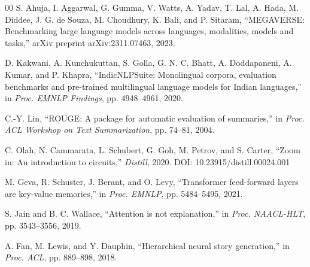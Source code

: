 \documentclass[conference]{IEEEtran}
\begin{document}
\begin{thebibliography}{00}
S. Ahuja, I. Aggarwal, G. Gumma, V. Watts, A. Yadav, 
T. Lal, A. Hada, M. Diddee, J. G. de Souza, M. Choudhury, 
K. Bali, and P. Sitaram, ``MEGAVERSE: Benchmarking large 
language models across languages, modalities, models and 
tasks,'' arXiv preprint arXiv:2311.07463, 2023.

D. Kakwani, A. Kunchukuttan, S. Golla, G. N. C. Bhatt, 
A. Doddapaneni, A. Kumar, and P. Khapra, 
``IndicNLPSuite: Monolingual corpora, evaluation benchmarks 
and pre-trained multilingual language models for Indian 
languages,'' in \emph{Proc. EMNLP Findings}, 
pp. 4948--4961, 2020.

C.-Y. Lin, ``ROUGE: A package for automatic evaluation 
of summaries,'' in \emph{Proc. ACL Workshop on Text 
Summarization}, pp. 74--81, 2004.

C. Olah, N. Cammarata, L. Schubert, G. Goh, M. Petrov, 
and S. Carter, ``Zoom in: An introduction to circuits,'' 
\emph{Distill}, 2020. DOI: 10.23915/distill.00024.001

M. Geva, R. Schuster, J. Berant, and O. Levy, 
``Transformer feed-forward layers are key-value memories,'' 
in \emph{Proc. EMNLP}, pp. 5484--5495, 2021.

S. Jain and B. C. Wallace, ``Attention is not 
explanation,'' in \emph{Proc. NAACL-HLT}, 
pp. 3543--3556, 2019.

A. Fan, M. Lewis, and Y. Dauphin, ``Hierarchical neural 
story generation,'' in \emph{Proc. ACL}, pp. 889--898, 
2018.

\end{thebibliography}
\end{document}
